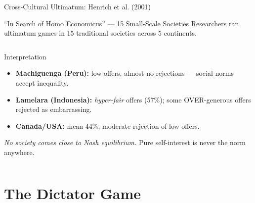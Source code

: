 \documentclass[aspectratio=169]{beamer}
\begin{document}
\begin{frame}{Cross-Cultural Ultimatum: Henrich et al. (2001)}
\begin{block}{``In Search of Homo Economicus'' --- 15 Small-Scale Societies}
Researchers ran ultimatum games in 15 traditional societies across 5 continents.
\end{block}
\begin{columns}
\begin{exampleblock}{Interpretation}
\begin{itemize}
  \item \textbf{Machiguenga (Peru):} low offers, almost no rejections --- social norms accept inequality.
  \item \textbf{Lamelara (Indonesia):} \textit{hyper-fair} offers (57\%); some OVER-generous offers rejected as embarrassing.
  \item \textbf{Canada/USA:} mean 44\%, moderate rejection of low offers.
\end{itemize}
\textit{No society comes close to Nash equilibrium.} Pure self-interest is \alert{never} the norm anywhere.
\end{exampleblock}
\end{columns}
\end{frame}

\section{The Dictator Game}
\end{document}
